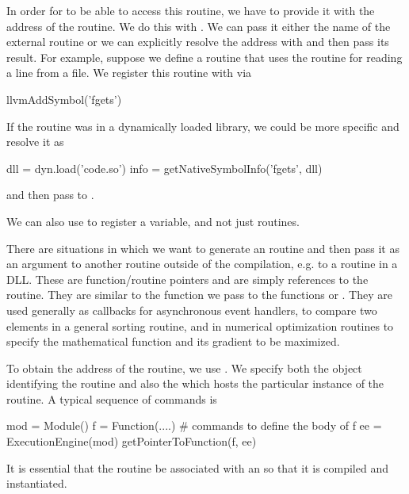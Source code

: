 \documentclass[article]{jss}
\begin{document}
In order for \llvm{} to
be able to access this routine, we have to provide it with the address
of the routine.  We do this with .  We can pass
it either the name of the external routine or we can explicitly
resolve the address with  and then pass its
result.
For example, suppose we define a routine that uses the 
\C{} routine  for reading a line from a file.
We register this routine with \llvm{} via
\begin{RCode}
llvmAddSymbol('fgets')
\end{RCode}
If the routine was in a dynamically loaded library, we could be
more specific and resolve it as
\begin{RCode}
dll = dyn.load('code.so')
info = getNativeSymbolInfo('fgets', dll)
\end{RCode}
and then pass  to .

We can also use  to register a variable, and not
just routines.



There are situations in which we want to generate an \llvm{} routine
and then pass it as an argument to another routine outside of the
\llvm{} compilation, e.g. to a routine in a DLL.  These are
function/routine pointers and are simply references to the routine.
They are similar to the function we pass to the \R{} functions
 or .  They are used generally as callbacks
for asynchronous event handlers, to compare two elements in a general
sorting routine, and in numerical optimization routines to specify the
mathematical function and its gradient to be maximized.

To obtain the address of the \llvm{} routine, we use
.  We specify both the 
object identifying the \llvm{} routine and also the
 which hosts the particular instance of the
routine. 
A typical sequence of commands is 
\begin{RCode}
mod = Module()
f = Function(....)
# commands to define the body of f
ee = ExecutionEngine(mod)
getPointerToFunction(f, ee)
\end{RCode}
It is essential that the routine be associated with an
 so that it is compiled and instantiated.


\end{document}
